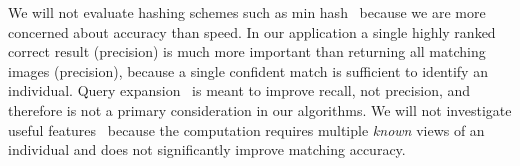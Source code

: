 
        We will not evaluate hashing schemes such as min
          hash~\cite{chum_fast_2012} because we are more concerned about
          accuracy than speed.
        In our application a single highly ranked correct result (precision)
          is much more important than returning all matching images (precision),
          because a single confident match is sufficient to identify an
          individual.
        Query expansion~\cite{chum_total_2011} is meant to improve recall, not
          precision, and therefore is not a primary consideration in our
          algorithms.
        We will not investigate useful features~\cite{turcot_better_2009}
          because the computation requires multiple \emph{known} views of an
          individual and does not significantly improve matching accuracy.
